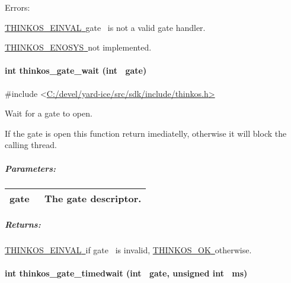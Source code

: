 {{Errors:}

{\protect\hyperlink{h.1tuee74}{THINKOS\_EINVAL}}{\protect\hyperlink{h.1tuee74}{~}}{gate}{~
is not a valid gate handler.}

{\protect\hyperlink{h.3s49zyc}{THINKOS\_ENOSYS}}{\protect\hyperlink{h.3s49zyc}{~}}{not
implemented. }

\paragraph{\texorpdfstring{{int thinkos\_gate\_wait (int
~gate)}}{int thinkos\_gate\_wait (int ~gate)}}\label{int-thinkos_gate_wait-int-gate}

{}

{\#include
\textless{}}{\protect\hyperlink{h.pkwqa1}{C:/devel/yard-ice/src/sdk/include/thinkos.h}}{\protect\hyperlink{h.pkwqa1}{\textgreater{}}}

{Wait for a gate to open. }

{If the gate is open this function return imediatelly, otherwise it will
block the calling thread.}

\subparagraph{\texorpdfstring{{Parameters:}}{Parameters:}}\label{parameters-42}

\protect\hypertarget{t.63aac5addc95ec2809d3272ba50ab5f93508edb0}{}{}\protect\hypertarget{t.42}{}{}

\begin{longtable}[]{@{}ll@{}}
\toprule
\begin{minipage}[t]{0.47\columnwidth}\raggedright\strut
{gate}{~}\strut
\end{minipage} & \begin{minipage}[t]{0.47\columnwidth}\raggedright\strut
{The gate descriptor. }\strut
\end{minipage}\tabularnewline
\bottomrule
\end{longtable}

\subparagraph{\texorpdfstring{{Returns:}}{Returns:}}\label{returns-45}

{\protect\hyperlink{h.1tuee74}{THINKOS\_EINVAL}}{\protect\hyperlink{h.1tuee74}{~}}{if
}{gate}{~ is invalid,
}{\protect\hyperlink{h.2fk6b3p}{THINKOS\_OK}}{\protect\hyperlink{h.2fk6b3p}{~}}{otherwise.
}

\paragraph{\texorpdfstring{{int thinkos\_gate\_timedwait (int ~gate,
unsigned int
~ms)}}{int thinkos\_gate\_timedwait (int ~gate, unsigned int ~ms)}}\label{int-thinkos_gate_timedwait-int-gate-unsigned-int-ms}

}
